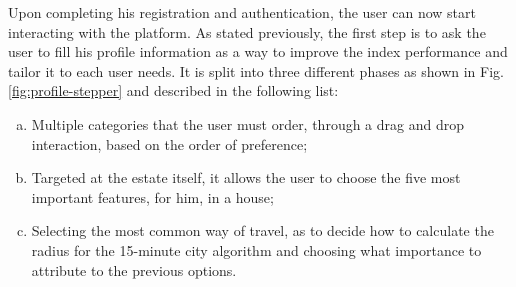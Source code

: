 Upon completing his registration and authentication, the user can now start interacting with the platform. As stated previously, the first step is to ask the user to fill his profile information as a way to improve the index performance and tailor it to each user needs. It is split into three different phases as shown in Fig. \ref{fig:profile-stepper} and described in the following list:

\begin{enumerate}[(a)]
    \item Multiple categories that the user must order, through a drag and drop interaction, based on the order of preference;
    \item Targeted at the estate itself, it allows the user to choose the five most important features, for him, in a house;
    \item Selecting the most common way of travel, as to decide how to calculate the radius for the 15-minute city algorithm and choosing what importance to attribute to the previous options.
\end{enumerate}

